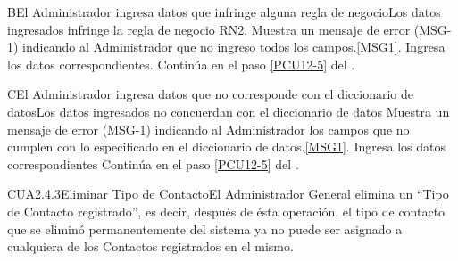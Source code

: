         \begin{UCtrayectoriaA}{B}{El Administrador ingresa datos que infringe alguna regla de negocio}{Los datos ingresados infringe la regla de negocio RN2.}
                        \UCpaso Muestra un mensaje de error (MSG-1) indicando al Administrador que no ingreso todos los campos.\ref{MSG1}.
			\UCpaso[\UCactor] Ingresa los datos correspondientes.
			\UCpaso Continúa en el paso \ref{PCU12-5} del .
	\end{UCtrayectoriaA}

        \begin{UCtrayectoriaA}{C}{El Administrador ingresa datos que no corresponde con el diccionario de datos}{Los datos ingresados no concuerdan con el diccionario de datos}
                        \UCpaso Muestra un mensaje de error (MSG-1) indicando al Administrador los campos que no cumplen con lo especificado en el diccionario de datos.\ref{MSG1}.
			\UCpaso[\UCactor] Ingresa los datos correspondientes
			\UCpaso Continúa en el paso \ref{PCU12-5} del .
	\end{UCtrayectoriaA}

	\begin{UseCase}{CUA2.4.3}{Eliminar Tipo de Contacto}{El Administrador General elimina un ``Tipo de Contacto registrado'', es decir, después de ésta operación, el tipo de contacto que se eliminó permanentemente del sistema ya no puede ser asignado a cualquiera de los Contactos registrados en el mismo.}
	\end{UseCase}

